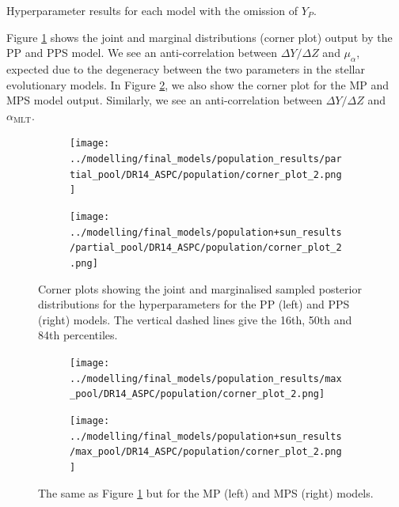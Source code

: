 \documentclass[a4paper,fleqn,usenatbib]{mnras}
\newcommand{\mlt}{\ensuremath{{\alpha_\mathrm{MLT}}}}
\begin{document}
\begin{table}
	\centering
	\caption{Hyperparameter results for each model with the omission of $Y_P$.}
	\label{tab:hparam_results}
	
\end{table}

Figure \ref{fig:corners-pp} shows the joint and marginal distributions (corner plot) output by the PP and PPS model. We see an anti-correlation between $\Delta Y / \Delta Z$ and $\mu_\alpha$, expected due to the degeneracy between the two parameters in the stellar evolutionary models. In Figure \ref{fig:corners-mp}, we also show the corner plot for the MP and MPS model output. Similarly, we see an anti-correlation between $\Delta Y / \Delta Z$ and $\mlt$.

\begin{figure}
    \begin{subfigure}[b]{.5\linewidth}
        \centering
        \texttt{[image: ../modelling/final\_models/population\_results/partial\_pool/DR14\_ASPC/population/corner\_plot\_2.png]}
    \end{subfigure}%
    \begin{subfigure}[b]{.5\linewidth}
        \centering
        \texttt{[image: ../modelling/final\_models/population+sun\_results/partial\_pool/DR14\_ASPC/population/corner\_plot\_2.png]}
    \end{subfigure}
    \caption{Corner plots showing the joint and marginalised sampled posterior distributions for the hyperparameters for the PP (left) and PPS (right) models. The vertical dashed lines give the 16th, 50th and 84th percentiles.}
    \label{fig:corners-pp}
\end{figure} 

\begin{figure}
    \begin{subfigure}[b]{.5\linewidth}
        \centering
        \texttt{[image: ../modelling/final\_models/population\_results/max\_pool/DR14\_ASPC/population/corner\_plot\_2.png]}
    \end{subfigure}%
    \begin{subfigure}[b]{.5\linewidth}
        \centering
        \texttt{[image: ../modelling/final\_models/population+sun\_results/max\_pool/DR14\_ASPC/population/corner\_plot\_2.png]}
    \end{subfigure}
    \caption{The same as Figure \ref{fig:corners-pp} but for the MP (left) and MPS (right) models.}
    \label{fig:corners-mp}
\end{figure} 
\end{document}
